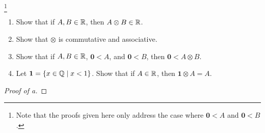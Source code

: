 \documentclass[../main.tex]{subfiles}
\begin{document}
\begin{exercise}\label{exr:7.40}
    \footnote{Note that the proofs given here only address the case where $\bm{0}<A$ and $\bm{0}<B$.}\leavevmode
    \begin{enumerate}[label={(\alph*)}]
        \item Show that if $A,B\in\mathbb{R}$, then $A\otimes B\in\mathbb{R}$.
        \item Show that $\otimes$ is commutative and associative.
        \item Show that if $A,B\in\mathbb{R}$, $\bm{0}<A$, and $\bm{0}<B$, then $\bm{0}<A\otimes B$.
        \item Let $\bm{1}=\{x\in\mathbb{Q}\mid x<1\}$. Show that if $A\in\mathbb{R}$, then $\bm{1}\otimes A=A$.
    \end{enumerate}
    \begin{proof}[Proof of a]


\end{proof}
\end{exercise}
\end{document}
